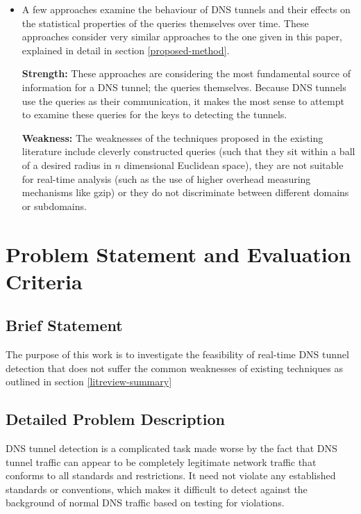 \documentclass[12pt]{report}
\theoremstyle{remark}
\theoremstyle{definition}
\theoremstyle{definition}
\theoremstyle{definition}
\begin{document}
\begin{itemize}
\item A few approaches examine the behaviour of DNS tunnels and their effects on
the statistical properties of the queries themselves over time. These approaches
consider very similar approaches to the one given in this paper, explained in
detail in section \ref{proposed-method}.

\textbf{Strength:} These approaches are considering the most fundamental source
of information for a DNS tunnel; the queries themselves. Because DNS tunnels use
the queries as their communication, it makes the most sense to attempt to
examine these queries for the keys to detecting the tunnels.

\textbf{Weakness:} The weaknesses of the techniques proposed in the existing
literature include cleverly constructed queries (such that they sit within a
ball of a desired radius in $n$ dimensional Euclidean space), they are not
suitable for real-time analysis (such as the use of higher overhead measuring
mechanisms like gzip) or they do not discriminate between different domains
or subdomains.
\end{itemize}

\newpage
\chapter{Problem Statement and Evaluation Criteria}

\section{Brief Statement} \label{briefproblem} The purpose of this work is to
investigate the feasibility of real-time DNS tunnel detection that does not
suffer the common weaknesses of existing techniques as outlined in section
\ref{litreview-summary}

\section{Detailed Problem Description} DNS tunnel detection is a complicated
task made worse by the fact that DNS tunnel traffic can appear to be completely
legitimate network traffic that conforms to all standards and restrictions. It
need not violate any established standards or conventions, which makes it
difficult to detect against the background of normal DNS traffic based on
testing for violations.
\end{document}
